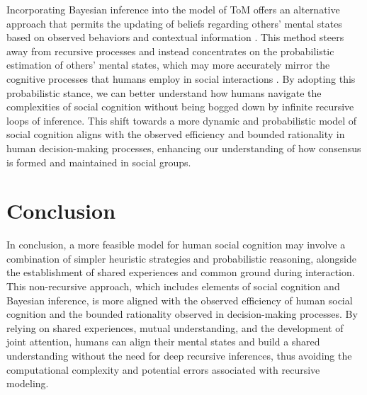\documentclass{article}
\begin{document}
Incorporating Bayesian inference into the model of ToM offers an alternative approach that permits the updating of beliefs regarding others' mental states based on observed behaviors and contextual information \citep{Khalvati2019}. This method steers away from recursive processes and instead concentrates on the probabilistic estimation of others' mental states, which may more accurately mirror the cognitive processes that humans employ in social interactions \citep{rabinowitz2018machine}. By adopting this probabilistic stance, we can better understand how humans navigate the complexities of social cognition without being bogged down by infinite recursive loops of inference. This shift towards a more dynamic and probabilistic model of social cognition aligns with the observed efficiency and bounded rationality in human decision-making processes, enhancing our understanding of how consensus is formed and maintained in social groups.




\section{Conclusion}
In conclusion, a more feasible model for human social cognition may involve a combination of simpler heuristic strategies and probabilistic reasoning, alongside the establishment of shared experiences and common ground during interaction. This non-recursive approach, which includes elements of social cognition and Bayesian inference, is more aligned with the observed efficiency of human social cognition and the bounded rationality observed in decision-making processes. By relying on shared experiences, mutual understanding, and the development of joint attention, humans can align their mental states and build a shared understanding without the need for deep recursive inferences, thus avoiding the computational complexity and potential errors associated with recursive modeling.





\end{document}

